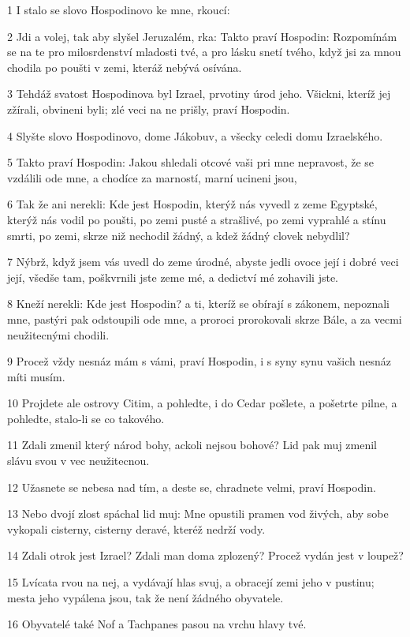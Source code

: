 \par 1 I stalo se slovo Hospodinovo ke mne, rkoucí:
\par 2 Jdi a volej, tak aby slyšel Jeruzalém, rka: Takto praví Hospodin: Rozpomínám se na te pro milosrdenství mladosti tvé, a pro lásku snetí tvého, když jsi za mnou chodila po poušti v zemi, kteráž nebývá osívána.
\par 3 Tehdáž svatost Hospodinova byl Izrael, prvotiny úrod jeho. Všickni, kteríž jej zžírali, obvineni byli; zlé veci na ne prišly, praví Hospodin.
\par 4 Slyšte slovo Hospodinovo, dome Jákobuv, a všecky celedi domu Izraelského.
\par 5 Takto praví Hospodin: Jakou shledali otcové vaši pri mne nepravost, že se vzdálili ode mne, a chodíce za marností, marní ucineni jsou,
\par 6 Tak že ani nerekli: Kde jest Hospodin, kterýž nás vyvedl z zeme Egyptské, kterýž nás vodil po poušti, po zemi pusté a strašlivé, po zemi vyprahlé a stínu smrti, po zemi, skrze niž nechodil žádný, a kdež žádný clovek nebydlil?
\par 7 Nýbrž, když jsem vás uvedl do zeme úrodné, abyste jedli ovoce její i dobré veci její, všedše tam, poškvrnili jste zeme mé, a dedictví mé zohavili jste.
\par 8 Kneží nerekli: Kde jest Hospodin? a ti, kteríž se obírají s zákonem, nepoznali mne, pastýri pak odstoupili ode mne, a proroci prorokovali skrze Bále, a za vecmi neužitecnými chodili.
\par 9 Procež vždy nesnáz mám s vámi, praví Hospodin, i s syny synu vašich nesnáz míti musím.
\par 10 Projdete ale ostrovy Citim, a pohledte, i do Cedar pošlete, a pošetrte pilne, a pohledte, stalo-li se co takového.
\par 11 Zdali zmenil který národ bohy, ackoli nejsou bohové? Lid pak muj zmenil slávu svou v vec neužitecnou.
\par 12 Užasnete se nebesa nad tím, a deste se, chradnete velmi, praví Hospodin.
\par 13 Nebo dvojí zlost spáchal lid muj: Mne opustili pramen vod živých, aby sobe vykopali cisterny, cisterny deravé, kteréž nedrží vody.
\par 14 Zdali otrok jest Izrael? Zdali man doma zplozený? Procež vydán jest v loupež?
\par 15 Lvícata rvou na nej, a vydávají hlas svuj, a obracejí zemi jeho v pustinu; mesta jeho vypálena jsou, tak že není žádného obyvatele.
\par 16 Obyvatelé také Nof a Tachpanes pasou na vrchu hlavy tvé.
